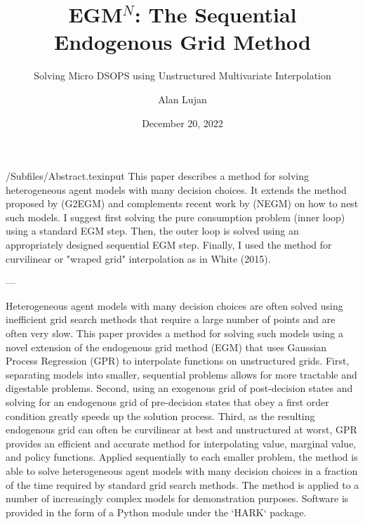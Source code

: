 \documentclass[HAFiscal]{subfiles}
\begin{document}

\title{EGM$^N$: The Sequential Endogenous Grid Method}
\subtitle{Solving Micro DSOPS using Unstructured Multivariate Interpolation}

\author{Alan Lujan}

\keywords{}


\renewcommand{\forcedate}{December 20, 2022}\date{\forcedate}

\maketitle
\hypertarget{abstract}{}
\begin{verbatimwrite}{\econtexRoot/Subfiles/Abstract.texinput}
  This paper describes a method for solving heterogeneous agent models
  with many decision choices. It extends the method proposed by (G2EGM)
  and
  complements recent work by (NEGM) on how to nest such models. I suggest
  first
  solving the pure consumption problem (inner loop) using a standard EGM
  step.
  Then, the outer loop is solved using an appropriately designed
  sequential EGM
  step. Finally, I used the method for curvilinear or "wraped grid"
  interpolation
  as in White (2015).

  ---

  Heterogeneous agent models with many decision choices are often solved using inefficient
  grid search methods that require a large number of points and are often very slow.
  This paper provides a method for solving such models using a novel extension of the
  endogenous grid method (EGM) that uses Gaussian Process Regression (GPR) to interpolate
  functions on unstructured grids. First, separating models into smaller, sequential problems
  allows for more tractable and digestable problems. Second, using an exogenous grid of
  post-decision states and solving for an endogenous grid of pre-decision states that obey
  a first order condition greatly speeds up the solution process. Third, as the resulting
  endogenous grid can often be curvilinear at best and unstructured at worst, GPR provides
  an efficient and accurate method for interpolating value, marginal value, and policy functions.
  Applied sequentially to each smaller problem, the method is able to solve heterogeneous agent
  models with many decision choices in a fraction of the time required by standard grid search methods.
  The method is applied to a number of increasingly complex models for demonstration purposes.
  Software is provided in the form of a Python module under the `HARK` package.

\end{verbatimwrite}

\end{document}
